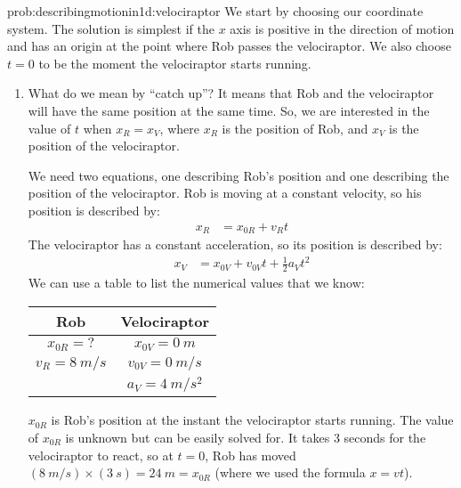 \newpage
\begin{solution}{prob:describingmotionin1d:velociraptor}\label{soln:describingmotionin1d:velociraptor}
We start by choosing our coordinate system. The solution is simplest if the $x$ axis is positive in the direction of motion and has an origin at the point where Rob passes the velociraptor. We also choose $t=0$ to be the moment the velociraptor starts running.\\


\begin{enumerate}[label=(\alph*)]
\item What do we mean by ``catch up''? It means that Rob and the velociraptor will have the same position at the same time. So, we are interested in the value of $t$ when $x_R=x_V$, where $x_R$ is the position of Rob, and $x_V$ is the position of the velociraptor. 

We need two equations, one describing Rob's position and one describing the position of the velociraptor. Rob is moving at a constant velocity, so his position is described by:
\begin{align*}
x_R&=x_{0R}+v_{R}t
\end{align*}
The velociraptor has a constant acceleration, so its position is described by:
\begin{align*}
x_V&=x_{0V}+v_{0V}t+\frac{1}{2}a_Vt^2
\end{align*}
We can use a table to list the numerical values that we know:
\vspace{0.25cm}
\begin{center}
\label{KnownsUnknownsSampleProb1D}
\begin{tabular}{|c|c|}
\hline
\textbf{Rob}          & \textbf{Velociraptor}  \\ \hline
$x_{0R} = ?$          & $x_{0V} = \SI{0}{m}$   \\
$v_R = \SI{8}{m/s}$   & $v_{0V} = \SI{0}{m/s}$ \\
                   & $a_V = \SI{4}{m/s^2}$  \\  
                   \hline                                   
\end{tabular}
\end{center}
\vspace{0.25cm}
$x_{0R}$ is Rob's position at the instant the velociraptor starts running. The value of $x_{0R}$ is unknown but can be easily solved for. It takes 3 seconds for the velociraptor to react, so at $t=0$, Rob has moved $(\SI{8}{m/s})\times (\SI{3}{s}) = \SI{24}{m} = x_{0R}$ (where we used the formula $x=vt$).


\end{enumerate}
\end{solution}
